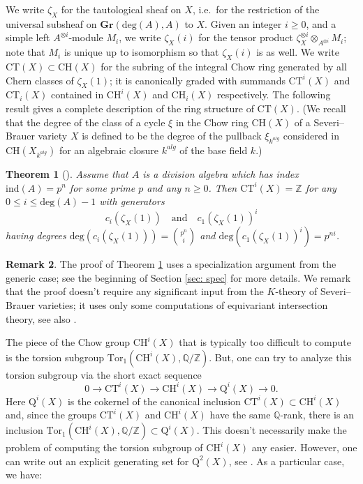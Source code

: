 \documentclass[12pt]{amsart}
\newtheorem{thm}{Theorem}[section]
\theoremstyle{definition}
\newtheorem{rmk}[thm]{Remark}
\newcommand{\CH}{\mathrm{CH}}
\newcommand{\CT}{\mathrm{CT}}
\newcommand{\Q}{\mathrm{Q}}
\begin{document}
We write $\zeta_X$ for the tautological sheaf on $X$, i.e.\ for the restriction of the universal subsheaf on $\mathbf{Gr}(\mathrm{deg}(A),A)$ to $X$. Given an integer $i\geq 0$, and a simple left $A^{\otimes i}$-module $M_i$, we write $\zeta_X(i)$ for the tensor product $\zeta_X^{\otimes i}\otimes_{A^{\otimes i}} M_i$; note that $M_i$ is unique up to isomorphism so that $\zeta_X(i)$ is as well. We write $\CT(X)\subset \CH(X)$ for the subring of the integral Chow ring generated by all Chern classes of $\zeta_X(1)$; it is canonically graded with summands $\CT^i(X)$ and $\CT_i(X)$ contained in $\CH^i(X)$ and $\CH_i(X)$ respectively. The following result gives a complete description of the ring structure of $\CT(X)$. (We recall that the degree of the class of a cycle $\xi$ in the Chow ring $\CH(X)$ of a Severi--Brauer variety $X$ is defined to be the degree of the pullback $\xi_{k^{alg}}$ considered in $\CH(X_{k^{alg}})$ for an algebraic closure $k^{alg}$ of the base field $k$.) 

\begin{thm}[{\cite[Proposition 3.3]{MR3581317}}]\label{thm: karct}
Assume that $A$ is a division algebra which has index $\mathrm{ind}(A)=p^n$ for some prime $p$ and any $n\geq 0$. Then $\CT^i(X)=\mathbb{Z}$ for any $0\leq i \leq \mathrm{deg}(A)-1$ with generators \[c_i(\zeta_X(1)) \quad \mbox{and} \quad c_1(\zeta_X(1))^i\]
having degrees $\mathrm{deg}(c_i(\zeta_X(1)))=\binom{p^n}{i}$ and $\mathrm{deg}(c_1(\zeta_X(1))^i)=p^{ni}$.
\end{thm}

\begin{rmk}
The proof of Theorem \ref{thm: karct} uses a specialization argument from the generic case; see the beginning of Section \ref{sec: spec} for more details. We remark that the proof doesn't require any significant input from the $K$-theory of Severi--Brauer varieties; it uses only some computations of equivariant intersection theory, see also \cite[\S8.1]{MR2258262}.
\end{rmk}

The piece of the Chow group $\CH^i(X)$ that is typically too difficult to compute is the torsion subgroup $\mathrm{Tor}_1(\CH^i(X),\mathbb{Q}/\mathbb{Z})$. But, one can try to analyze this torsion subgroup via the short exact sequence \[ 0\rightarrow \CT^i(X)\rightarrow \CH^i(X)\rightarrow \Q^i(X)\rightarrow 0.\] Here $\Q^i(X)$ is the cokernel of the canonical inclusion $\CT^i(X)\subset \CH^i(X)$ and, since the groups $\CT^i(X)$ and $\CH^i(X)$ have the same $\mathbb{Q}$-rank, there is an inclusion $\mathrm{Tor}_1(\CH^i(X),\mathbb{Q}/\mathbb{Z})\subset \Q^i(X)$. This doesn't necessarily make the problem of computing the torsion subgroup of $\CH^i(X)$ any easier. However, one can write out an explicit generating set for $\Q^2(X)$, see \cite[Proposition 3.7]{MR4280495}. As a particular case, we have:
\end{document}
